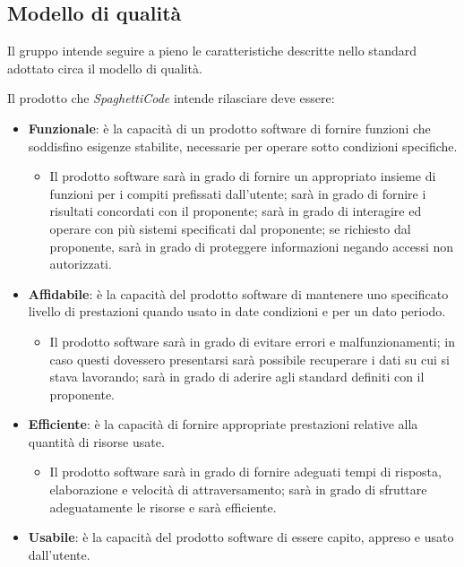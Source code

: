 \documentclass[../piano_di_qualifica.tex]{subfiles}
\begin{document}
\subsection{Modello di qualità}
Il gruppo intende seguire a pieno le caratteristiche descritte nello standard adottato circa il modello di qualità.\par
Il prodotto che \emph{SpaghettiCode} intende rilasciare deve essere:\par
\begin{itemize}
	\item \textbf{Funzionale}: è la capacità di un prodotto software di fornire funzioni che soddisfino esigenze stabilite, necessarie per operare sotto condizioni specifiche.
	      \begin{itemize}
		      \item Il prodotto software sarà in grado di fornire un appropriato insieme di funzioni per i compiti prefissati dall’utente; sarà in grado di fornire i risultati concordati con il proponente; sarà in grado di interagire ed operare con più sistemi specificati dal proponente; se richiesto dal proponente, sarà in grado di proteggere informazioni negando accessi non autorizzati.
	      \end{itemize}
	\item \textbf{Affidabile}: è la capacità del prodotto software di mantenere uno specificato livello di prestazioni quando usato in date condizioni e per un dato periodo.
	      \begin{itemize}
		      \item Il prodotto software sarà in grado di evitare errori e malfunzionamenti; in caso questi dovessero presentarsi sarà possibile recuperare i dati su cui si stava lavorando; sarà in grado di aderire agli standard definiti con il proponente.
	      \end{itemize}
	\item \textbf{Efficiente}: è la capacità di fornire appropriate prestazioni relative alla quantità di risorse usate.
	      \begin{itemize}
		      \item Il prodotto software sarà in grado di fornire adeguati tempi di risposta, elaborazione e velocità di attraversamento; sarà in grado di sfruttare adeguatamente le risorse e sarà efficiente.
	      \end{itemize}
	\item \textbf{Usabile}: è la capacità del prodotto software di essere capito, appreso e usato dall'utente.
	      \begin{itemize}

\end{itemize}
\end{itemize}
\end{document}
